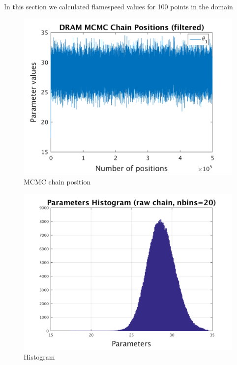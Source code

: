 In this section we calculated flamespeed values for 100 points in the domain 
\begin{figure}[H]
  
  \centering
   \includegraphics[scale=0.75]{53_results/output_100/simple_ip_chain_pos_filt}
   \caption{MCMC chain position }
\end{figure}
%
%
\begin{figure}[H]
  
  \centering
   \includegraphics[scale=0.75]{53_results/output_100/simple_ip_hist_raw}
   \caption{Histogram}
\end{figure}
%
%
%
